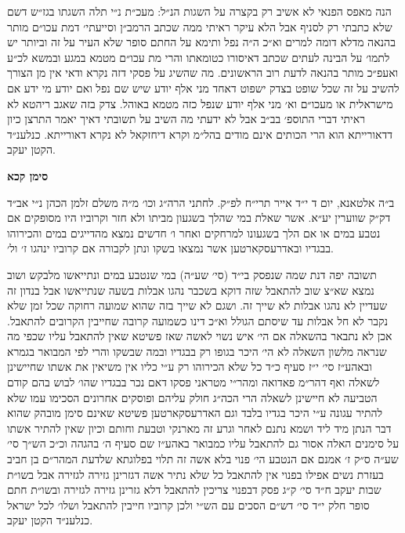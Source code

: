 \documentclass[12pt, openany]{book}
\newcommand{\chapname}{}
\newcommand{\newchap}[1]{
	\addcontentsline{toc}{chapter}{#1}
	\renewcommand{\chapname}{#1}
		\begin{center}
			\textbf{%
\fontsize{16pt}{16pt}\selectfont
				#1}
		\end{center}
}
\begin{document}
\begin{multicols}{2}
הנה מאפס הפנאי לא אשיב רק בקצרה על השגות הנ״ל: מעכ״ת נ״י תלה השגתו בגז״ש דשם שלא כתבתי רק לסניף אבל הלא עיקר ראיתי ממה שכתב הרמב״ן וסייעתי׳ דמת עכו״ם מותר בהנאה מדלא דומה למרים וא״כ ה״ה נפל ותימא על החתם סופר שלא העיר על זה וביותר יש לתמו׳ על הבינה לעתים שכתב דאיסורו כטומאתו והרי מת עכו״ם מטמא במגע ובמשא לכ״ע ואעפ״כ מותר בהנאה לדעת רוב הראשונים. מה שהשיג על פסקי דזה נקרא ודאי אין מן הצורך להשיב על זה שכל שופט בצדק ישפוט דאחד מני אלף יודע שיש שם נפל ואם יודע מי ידע אם מישראלית או מעכו״ם וא׳ מני אלף יודע שנפל כזה מטמא באוהל. צדק בזה שאגב ריהטא לא ראיתי דברי התוספ׳ בב״ב אבל לא ידעתי מה השיב על תשובתי דאיך יאמר התרצן כיון דדאורייתא הוא הרי הכותים אינם מודים בהל״מ וקרא דיחזקאל לא נקרא דאורייתא. כנלענ״ד הקטן יעקב.\\\vspace{0pt}

\end{multicols}\newpage

\newchap{סימן קכא}
\begin{multicols}{2}
ב״ה אלטאנא, יום ד י״ד אייר תרי״ח לפ״ק. לחתני הרה״ג וכו׳ מ״ה משלם זלמן הכהן נ״י אב״ד דק״ק שווערין יע״א. אשר שאלת במי שהלך בשגעון מביתו ולא חזר וקרוביו היו מסופקים אם נטבע במים או אם הלך בשגעונו למרחקים ואחר ו׳ חדשים נמצא מהדייגים במים והכירוהו בבגדיו ובאדרעסקארטען אשר נמצאו בשקו ונתן לקבורה אם קרוביו ינהגו ז׳ ול׳.\\\vspace{0pt}

תשובה יפה דנת שמה שנפסק בי״ד (סי׳ שע״ה) במי שנטבע במים ונתייאשו מלבקש ושוב נמצא שא״צ שוב להתאבל שזה דוקא בשכבר נהגו אבלות בשעה שנתייאשו אבל בנדון זה שעדיין לא נהגו אבלות לא שייך זה. ושגם לא שייך בזה שהוא שמועה רחוקה שכל זמן שלא נקבר לא חל אבלות עד שיסתם הגולל וא״כ דינו כשמועה קרובה שחייבין הקרובים להתאבל. אכן לא נתבאר בהשאלה אם הי׳ איש נשוי לאשה שאז פשיטא שאין להתאבל עליו שכפי מה שנראה מלשון השאלה לא הי׳ היכר בגופו רק בבגדיו ובמה שבשקו והרי לפי המבואר בגמרא ובאהע״ז סי׳ י״ז סעיף כ״ד כל שלא הכירוהו רק ע״י כליו אין משיאין את אשתו שחיישינן לשאלה ואף דהר״מ פאדואה ומהר״י מטראני פסקו דאם נכר בבגדיו שהו׳ לבוש בהם קודם הטביעה לא חיישינן לשאלה הרי הכה״ג חולק עליהם ופוסקים אחרונים הסכימו עמו שלא להתיר עגונה ע״י היכר בגדיו בלבד וגם האדרעסקארטען פשיטא שאינם סימן מובהק שהוא דבר הנתן מיד ליד ושמא נתנם לאחר וגרע זה מארנקי וטבעת וחותם וכיון שאין להתיר אשתו על סימנים האלה אסור גם להתאבל עליו כמבואר באהע״ז שם סעיף ה׳ בהגהה וכ״כ הש״ך סי׳ שע״ה ס״ק ז׳ אמנם אם הנטבע הי׳ פנוי בלא אשה זה תלוי בפלוגתא שלדעת המהר״ם בן חביב בעזרת נשים אפילו בפנוי אין להתאבל כל שלא נתיר אשה דגזרינן גזירה לגזירה אבל בשו״ת שבות יעקב ח״ד סי׳ ק״ג פסק דבפנוי צריכין להתאבל דלא גזרינן גזירה לגזירה ובשו״ת חתם סופר חלק י״ד סי׳ דש״ם הסכים עם הש״י ולכן קרוביו חייבין להתאבל ושלו׳ לכל ישראל כנלענ״ד הקטן יעקב.\\\vspace{0pt}

\end{multicols}\newpage
\end{document}
